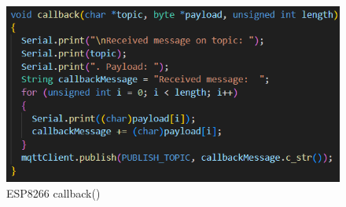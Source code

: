 \documentclass[12pt, letterpaper]{article}
\begin{document}
\begin{figure}[h]
  \centering
  \includegraphics{callback.png}
  \caption{ESP8266 callback()}
  \label{abb:callback}
\end{figure}

\newpage
\listoffigures
\end{document}
